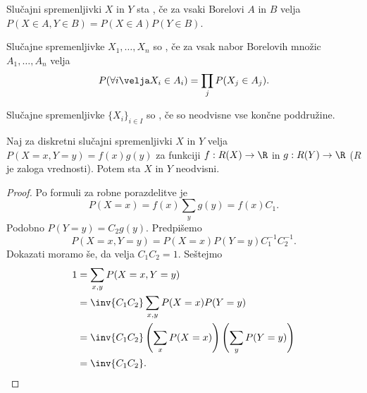 
\begin{definicija}
  Slučajni spremenljivki $X$ in $Y$ sta , če za vsaki Borelovi
  $A$ in $B$ velja $P(X \in A, Y \in B) = P(X \in A) P(Y \in B)$.
\end{definicija}

\begin{definicija}
  Slučajne spremenljivke $X_1, \ldots, X_n$ so , če za vsak
  nabor Borelovih množic $A_1, \ldots, A_n$ velja
  \[
	P(\forall i \velja X_i \in A_i) = \prod_j P(X_j \in A_j).
  \]
\end{definicija}

\begin{definicija}
  Slučajne spremenljivke $\{X_i\}_{i \in I}$ so , če so
  neodvisne vse končne poddružine.
\end{definicija}


\begin{izrek}
  Naj za diskretni slučajni spremenljivki $X$ in $Y$ velja $P(X = x, Y = y) =
  f(x) g(y)$ za funkciji $f : R(X) \to \R$ in $g: R(Y) \to \R$ ($R$ je zaloga
  vrednosti).
  Potem sta $X$ in $Y$ neodvisni.
\end{izrek}

\begin{proof}
  Po formuli za robne porazdelitve je
  \[
	P(X = x) = f(x) \sum_y g(y) = f(x) C_1.
  \]
  Podobno $P(Y = y) = C_2 g(y)$.
  Predpišemo
  \[
	P(X = x, Y = y) = P(X = x) P(Y = y) C_1^{-1} C_2^{-1}.
  \]
  Dokazati moramo še, da velja $C_1 C_2 = 1$.
  Seštejmo
  \begin{align*}
	1 &= \sum_{x, y} P(X = x, Y = y) \\
	&= \inv{C_1 C_2} \sum_{x, y} P(X = x) P(Y = y)  \\
	&= \inv{C_1 C_2} \left( \sum_x P(X = x) \right) \left( \sum_y P(Y = y)
	\right) \\
	&= \inv{C_1 C_2}.
  \end{align*}
\end{proof}

